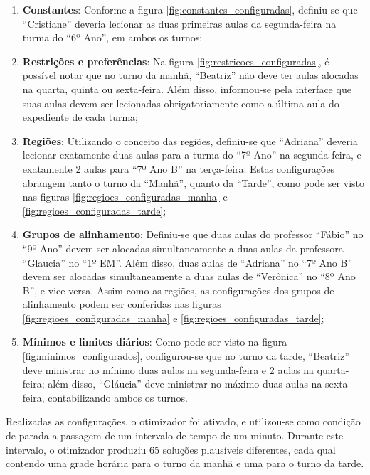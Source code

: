 \newpage
\begin{enumerate}
	\item \label{item_constantes} \textbf{Constantes}: Conforme a figura \ref{fig:constantes_configuradas}, definiu-se que ``Cristiane'' deveria lecionar as duas primeiras aulas da segunda-feira na turma do ``6º Ano'', em ambos os turnos;
	\item \label{item_restricoes} \textbf{Restrições e preferências}: Na figura \ref{fig:restricoes_configuradas}, é possível notar que no turno da manhã, ``Beatriz'' não deve ter aulas alocadas na quarta, quinta ou sexta-feira. Além disso, informou-se pela interface que suas aulas devem ser lecionadas obrigatoriamente como a última aula do expediente de cada turma;
	\item \label{item_regioes} \textbf{Regiões}: Utilizando o conceito das regiões, definiu-se que ``Adriana'' deveria lecionar exatamente duas aulas para a turma do ``7º Ano'' na segunda-feira, e exatamente 2 aulas para ``7º Ano B'' na terça-feira. Estas configurações abrangem tanto o turno da ``Manhã'', quanto da ``Tarde'', como pode ser visto nas figuras \ref{fig:regioes_configuradas_manha} e \ref{fig:regioes_configuradas_tarde};
	\item \label{item_grupos} \textbf{Grupos de alinhamento}: Definiu-se que duas aulas do professor ``Fábio'' no ``9º Ano'' devem ser alocadas simultaneamente a duas aulas da professora ``Glaucia'' no ``1º EM''. Além disso, duas aulas de ``Adriana'' no ``7º Ano B'' devem ser alocadas simultaneamente a duas aulas de ``Verônica'' no ``8º Ano B'', e vice-versa. Assim como as regiões, as configurações dos grupos de alinhamento podem ser conferidas nas figuras \ref{fig:regioes_configuradas_manha} e \ref{fig:regioes_configuradas_tarde};
	\item \label{item_minimos} \textbf{Mínimos e limites diários}: Como pode ser visto na figura \ref{fig:minimos_configurados}, configurou-se que no turno da tarde, ``Beatriz'' deve ministrar no mínimo duas aulas na segunda-feira e 2 aulas na quarta-feira; além disso, ``Gláucia'' deve ministrar no máximo duas aulas na sexta-feira, contabilizando ambos os turnos.
\end{enumerate}

Realizadas as configurações, o otimizador foi ativado, e utilizou-se como condição de parada a passagem de um intervalo de tempo de um minuto. Durante este intervalo, o otimizador produziu 65 soluções plausíveis diferentes, cada qual contendo uma grade horária para o turno da manhã e uma para o turno da tarde.

